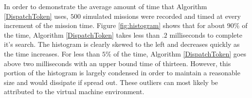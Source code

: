 In order to demonstrate the average amount of time that Algorithm
\ref{DispatchToken} uses, $500$ simulated missions were recorded and timed
at every increment of the mission time. Figure \ref{fig:histogram} shows that for about
$90\%$ of the time, Algorithm \ref{DispatchToken} takes less than $.2$
milliseconds to complete it's search. The histogram is clearly skewed
to the left and decreases quickly as the time increases.  For less than $5\%$
of the time, Algorithm \ref{DispatchToken} goes above two
milliseconds with an upper bound time of thirteen. However, this
portion of the histogram is largely condensed in order to maintain a
reasonable size and would dissipate if spread out. These outliers can 
most likely be attributed to the virtual machine environment.


